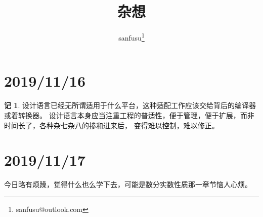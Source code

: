 \documentclass{ctexart}
\theoremstyle{definition} \newtheorem{note}{记}[section]
\begin{document}
\title{杂想}
\author{sanfusu\thanks{sanfusu@outlook.com}}
\maketitle

\section{2019/11/16}
\begin{note}
    设计语言已经无所谓适用于什么平台，这种适配工作应该交给背后的编译器或着转换器。
    设计语言本身应当注重工程的普适性，便于管理，便于扩展，而非时间长了，各种杂七杂八的掺和进来后，
    变得难以控制，难以修正。
\end{note}

\section{2019/11/17}
今日略有烦躁，觉得什么也么学下去，可能是数分实数性质那一章节恼人心烦。
\end{document}
